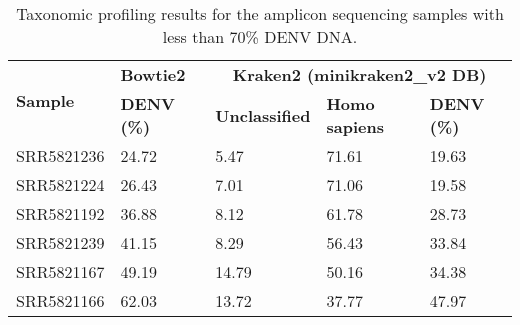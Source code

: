 \begin{longtable}{@{}lllll@{}}
\caption{Taxonomic profiling results for the amplicon sequencing samples with less than 70\% DENV DNA.}
\label{tab:chap4_s5}\\
\toprule
\multirow{2}{*}{\textbf{Sample}} & \textbf{Bowtie2}   & \multicolumn{3}{c}{\textbf{Kraken2 (minikraken2\_v2 DB)}}        \\* \cmidrule(l){2-5} 
                                 & \textbf{DENV (\%)} & \textbf{Unclassified} & \textbf{Homo sapiens} & \textbf{DENV (\%)} \\* \midrule
SRR5821236 & 24.72 & 5.47  & 71.61 & 19.63 \\*
SRR5821224 & 26.43 & 7.01  & 71.06 & 19.58 \\* 
SRR5821192 & 36.88 & 8.12  & 61.78 & 28.73 \\* 
SRR5821239 & 41.15 & 8.29  & 56.43 & 33.84 \\* 
SRR5821167 & 49.19 & 14.79 & 50.16 & 34.38 \\* 
SRR5821166 & 62.03 & 13.72 & 37.77 & 47.97 \\* 
\end{longtable}